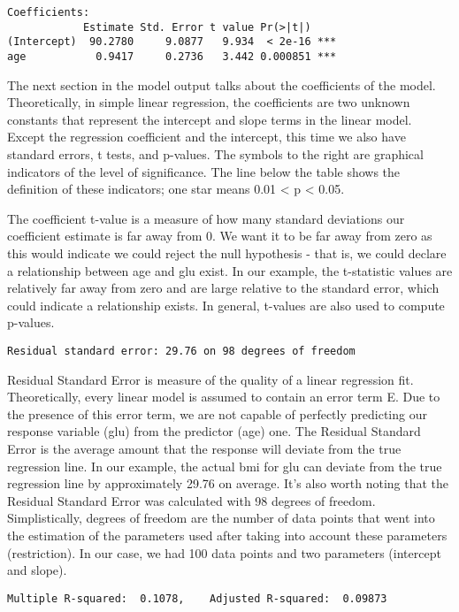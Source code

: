 \documentclass[]{book}
\theoremstyle{definition}
\theoremstyle{definition}
\theoremstyle{definition}
\theoremstyle{remark}
\begin{document}
\begin{verbatim}
Coefficients:
            Estimate Std. Error t value Pr(>|t|)    
(Intercept)  90.2780     9.0877   9.934  < 2e-16 ***
age           0.9417     0.2736   3.442 0.000851 ***
\end{verbatim}

The next section in the model output talks about the coefficients of the
model. Theoretically, in simple linear regression, the coefficients are
two unknown constants that represent the intercept and slope terms in
the linear model. Except the regression coefficient and the intercept,
this time we also have standard errors, t tests, and p-values. The
symbols to the right are graphical indicators of the level of
significance. The line below the table shows the definition of these
indicators; one star means 0.01 \textless{} p \textless{} 0.05.

The coefficient t-value is a measure of how many standard deviations our
coefficient estimate is far away from 0. We want it to be far away from
zero as this would indicate we could reject the null hypothesis - that
is, we could declare a relationship between age and glu exist. In our
example, the t-statistic values are relatively far away from zero and
are large relative to the standard error, which could indicate a
relationship exists. In general, t-values are also used to compute
p-values.

\begin{verbatim}
Residual standard error: 29.76 on 98 degrees of freedom
\end{verbatim}

Residual Standard Error is measure of the quality of a linear regression
fit. Theoretically, every linear model is assumed to contain an error
term E. Due to the presence of this error term, we are not capable of
perfectly predicting our response variable (glu) from the predictor
(age) one. The Residual Standard Error is the average amount that the
response will deviate from the true regression line. In our example, the
actual bmi for glu can deviate from the true regression line by
approximately 29.76 on average. It's also worth noting that the Residual
Standard Error was calculated with 98 degrees of freedom.
Simplistically, degrees of freedom are the number of data points that
went into the estimation of the parameters used after taking into
account these parameters (restriction). In our case, we had 100 data
points and two parameters (intercept and slope).

\begin{verbatim}
Multiple R-squared:  0.1078,    Adjusted R-squared:  0.09873
\end{verbatim}
\end{document}
